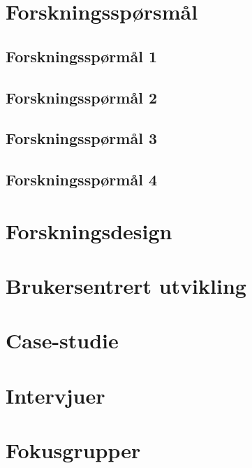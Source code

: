 \section{Forskningsspørsmål}
\subsection{Forskningsspørmål 1}
\subsection{Forskningsspørmål 2}
\subsection{Forskningsspørmål 3}
\subsection{Forskningsspørmål 4}

\section{Forskningsdesign}
\blindtext

\section{Brukersentrert utvikling}
\blindtext

\section{Case-studie}
\blindtext

\section{Intervjuer}
\blindtext

\section{Fokusgrupper}
\blindtext
